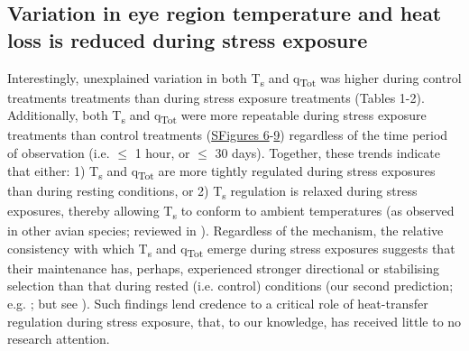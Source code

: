 \documentclass[12pt]{article}
\begin{document}
\subsection{Variation in eye region temperature and heat loss is reduced during stress exposure}
\vspace{0.5cm}

\noindent Interestingly, unexplained variation in both T\textsubscript{s} and q\textsubscript{Tot} was higher during control treatments treatments than during stress exposure treatments (Tables 1-2). Additionally, both T\textsubscript{s} and q\textsubscript{Tot} were more repeatable during stress exposure treatments than control treatments (\hyperref[FigC.6]{SFigures 6}-\hyperref[FigC.9]{9}) regardless of the time period of observation (i.e. $\leq$ 1 hour, or $\leq$ 30 days). Together, these trends indicate that either: 1) T\textsubscript{s} and q\textsubscript{Tot} are more tightly regulated during stress exposures than during resting conditions, or 2) T\textsubscript{s} regulation is relaxed during stress exposures, thereby allowing T\textsubscript{s} to conform to ambient temperatures (as observed in other avian species; reviewed in \citealt{angilletta_2019}). Regardless of the mechanism, the relative consistency with which T\textsubscript{s} and q\textsubscript{Tot} emerge during stress exposures suggests that their maintenance has, perhaps, experienced stronger directional or stabilising selection than that during rested (i.e. control) conditions (our second prediction; e.g. \citealt{gibson_1974,lande_1983,vanhomrigh_2007}; but see \citealt{kotiaho_2001}). Such findings lend credence to a critical role of heat-transfer regulation during stress exposure, that, to our knowledge, has received little to no research attention. \vspace{1cm}
\end{document}

